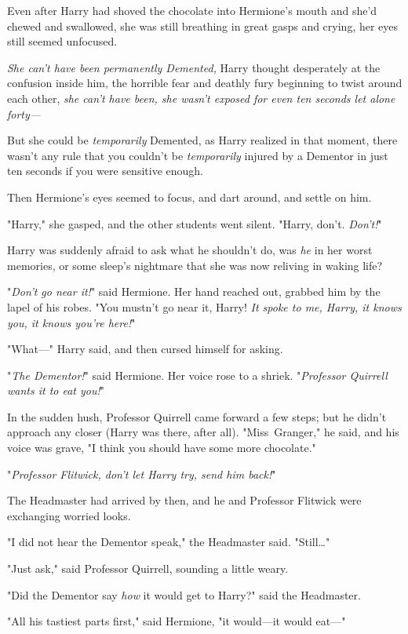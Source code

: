 Even after Harry had shoved the chocolate into Hermione's mouth and she'd
chewed and swallowed, she was still breathing in great gasps and crying, her
eyes still seemed unfocused.

\emph{She can't have been permanently Demented,} Harry thought desperately at
the confusion inside him, the horrible fear and deathly fury beginning to twist
around each other, \emph{she can't have been, she wasn't exposed for even ten
seconds let alone forty—}

But she could be \emph{temporarily} Demented, as Harry realized in that moment,
there wasn't any rule that you couldn't be \emph{temporarily} injured by a
Dementor in just ten seconds if you were sensitive enough.

Then Hermione's eyes seemed to focus, and dart around, and settle on him.

"Harry," she gasped, and the other students went silent. "Harry, don't.
\emph{Don't!}"

Harry was suddenly afraid to ask what he shouldn't do, was \emph{he} in her
worst memories, or some sleep's nightmare that she was now reliving in waking
life?

"\emph{Don't go near it!}" said Hermione. Her hand reached out, grabbed him by
the lapel of his robes. "You mustn't go near it, Harry! \emph{It spoke to me,
Harry, it knows you, it knows you're here!}"

"What—" Harry said, and then cursed himself for asking.

"\emph{The Dementor!}" said Hermione. Her voice rose to a shriek.
"\emph{Professor Quirrell wants it to eat you!}"

In the sudden hush, Professor Quirrell came forward a few steps; but he didn't
approach any closer (Harry was there, after all). "Miss~Granger," he said, and
his voice was grave, "I think you should have some more chocolate."

"\emph{Professor Flitwick, don't let Harry try, send him back!}"

The Headmaster had arrived by then, and he and Professor Flitwick were
exchanging worried looks.

"I did not hear the Dementor speak," the Headmaster said. "Still…"

"Just ask," said Professor Quirrell, sounding a little weary.

"Did the Dementor say \emph{how} it would get to Harry?" said the Headmaster.

"All his tastiest parts first," said Hermione, "it would—it would eat—"

